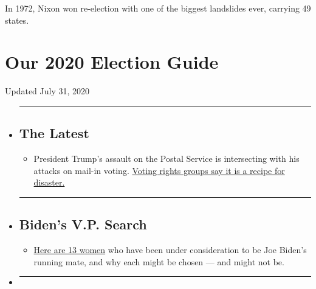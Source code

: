 In 1972, Nixon won re-election with one of the biggest landslides ever,
carrying 49 states.

\hypertarget{our-2020-election-guide}{%
\section{Our 2020 Election Guide}\label{our-2020-election-guide}}

Updated July 31, 2020

\begin{itemize}
\item
  \begin{center}\rule{0.5\linewidth}{\linethickness}\end{center}

  \hypertarget{the-latest}{%
  \subsection{The Latest}\label{the-latest}}

  \begin{itemize}
  \tightlist
  \item
    President Trump's assault on the Postal Service is intersecting with
    his attacks on mail-in voting.
    \href{https://www.nytimes.com/2020/07/31/us/politics/trump-usps-mail-delays.html?action=click\&pgtype=Article\&state=default\&region=BELOW_MAIN_CONTENT\&context=storylines_guide}{Voting
    rights groups say it is a recipe for disaster.}
  \end{itemize}
\item
  \begin{center}\rule{0.5\linewidth}{\linethickness}\end{center}

  \hypertarget{bidens-vp-search}{%
  \subsection{Biden's V.P. Search}\label{bidens-vp-search}}

  \begin{itemize}
  \tightlist
  \item
    \href{https://www.nytimes.com/article/biden-vice-president-2020.html?action=click\&pgtype=Article\&state=default\&region=BELOW_MAIN_CONTENT\&context=storylines_guide}{Here
    are 13 women} who have been under consideration to be Joe Biden's
    running mate, and why each might be chosen --- and might not be.
  \end{itemize}
\item
  \begin{center}\rule{0.5\linewidth}{\linethickness}\end{center}


\end{itemize}
